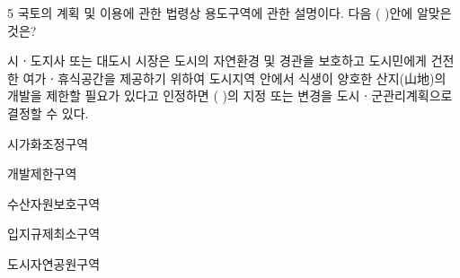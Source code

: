 \begin{question}{5}
국토의 계획 및 이용에 관한 법령상 용도구역에 관한 설명이다. 다음 ( )안에 알맞은 것은?
\begin{framedtext}
시ㆍ도지사 또는 대도시 시장은 도시의 자연환경 및 경관을 보호하고 도시민에게 건전한 여가ㆍ휴식공간을 제공하기 위하여 도시지역 안에서 식생이 양호한 산지(山地)의 개발을 제한할 필요가 있다고 인정하면 ( )의 지정 또는 변경을 도시ㆍ군관리계획으로 결정할 수 있다.
\end{framedtext}
\begin{choices}
  \item 시가화조정구역
  \item 개발제한구역
  \item 수산자원보호구역
  \item 입지규제최소구역
  \item 도시자연공원구역
\end{choices}
\end{question}
